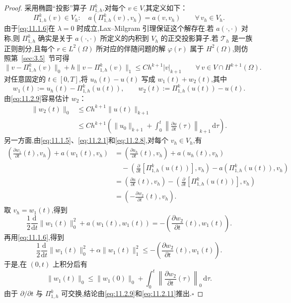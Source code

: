 \begin{proof}
采用椭圆“投影”算子 \(\Pi_{1,h}^k\).对每个 \(v\in V\),其定义如下：
\begin{equation}\label{eq:11.2.8}
  \Pi_{1,h}^k(v)\in V_h:\quad
       a(\Pi_{1,h}^k(v),v_h)=a(v,v_h)\qquad\forall\,v_h\in V_h.
\end{equation}
由于\eqref{eq:11.1.6}在 \(\lambda=0\) 时成立,Lax--Milgram 引理保证这个解存在.若 \(a(\cdot,\cdot)\) 对称,则 \(\Pi_{1,h}^k\) 确实是关于 \(a(\cdot,\cdot)\) 所定义的内积到 \(V_h\) 的正交投影算子.若 \(\mathcal T_h\) 是一族正则剖分,且每个 \(r\in L^2(\Omega)\) 所对应的伴随问题的解 \(\varphi(r)\) 属于 \(H^2(\Omega)\),则仿照第~\ref{sec:3.5}~节可得
\begin{equation}\label{eq:11.2.9}
  \|v-\Pi_{1,h}^k(v)\|_0+h\|v-\Pi_{1,h}^k(v)\|_1
       \le Ch^{k+1}|v|_{k+1}\qquad\forall\,v\in V\cap H^{k+1}(\Omega).
\end{equation}
对任意固定的 \(t\in[0,T]\),将 \(u_h(t)-u(t)\) 写成 \(w_1(t)+w_2(t)\),其中
\begin{equation}\label{eq:11.2.10}
  w_1(t):=u_h(t)-\Pi_{1,h}^k(u(t)),\qquad w_2(t):=\Pi_{1,h}^k(u(t))-u(t).
\end{equation}
由\eqref{eq:11.2.9}容易估计 \(w_2\)：
\begin{equation}\label{eq:11.2.11}
  \begin{aligned}
    \|w_2(t)\|_0
      &\le Ch^{k+1}\|u(t)\|_{k+1}\\
      &\le Ch^{k+1}\left(\|u_0\|_{k+1}
              +\int_0^t\left\|\frac{\partial u}{\partial t}(\tau)\right\|_{k+1}\,\mathrm d\tau\right).
  \end{aligned}
\end{equation}
另一方面,由\eqref{eq:11.1.5}、\eqref{eq:11.2.1}和\eqref{eq:11.2.8},对每个 \(v_h\in V_h\),有
\[
  \begin{aligned}
    \left(\frac{\partial w_1}{\partial t}(t),v_h\right)+a(w_1(t),v_h)
      &=\left(\frac{\partial u_h}{\partial t}(t),v_h\right)+a(u_h(t),v_h)\\
      &\quad-\left(\frac{\partial}{\partial t}[\Pi_{1,h}^k(u(t))],v_h\right)
         -a(\Pi_{1,h}^k(u(t)),v_h)\\
      &=\left(\frac{\partial u}{\partial t}(t),v_h\right)
          -\left(\frac{\partial}{\partial t}[\Pi_{1,h}^k(u(t))],v_h\right)\\
      &=\left(-\frac{\partial w_2}{\partial t}(t),v_h\right).
  \end{aligned}
\]
取 \(v_h=w_1(t)\),得到
\[
  \frac12\frac{\mathrm d}{\mathrm dt}\|w_1(t)\|_0^2+a(w_1(t),w_1(t))
     =-\left(\frac{\partial w_2}{\partial t}(t),w_1(t)\right).
\]
再用\eqref{eq:11.1.6},得到
\begin{equation}\label{eq:11.2.12}
  \frac12\frac{\mathrm d}{\mathrm dt}\|w_1(t)\|_0^2+\alpha\|w_1(t)\|_1^2
     \le-\left(\frac{\partial w_2}{\partial t}(t),w_1(t)\right).
\end{equation}
于是,在 \((0,t)\) 上积分后有
\[
  \|w_1(t)\|_0\le\|w_1(0)\|_0
       +\int_0^t\left\|\frac{\partial w_2}{\partial t}(\tau)\right\|_0\,\mathrm d\tau.
\]
由于 \(\partial/\partial t\) 与 \(\Pi_{1,h}^k\) 可交换,结论由\eqref{eq:11.2.9}和\eqref{eq:11.2.11}推出.\hfill\(\square\)
\end{proof}

